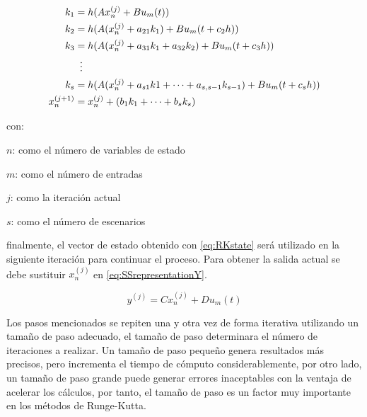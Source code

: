             \begin{equation}\label{eq:RKstate}
                \begin{aligned}
                    k_1 &= h(Ax_n^{(j)} + Bu_m(t))\\
                    k_2 &= h(A(x_n^{(j)} +  a_{21}k_1) + Bu_m(t + c_2 h))\\
                    k_3 &= h(A(x_n^{(j)} +  a_{31}k_1 + a_{32}k_2) + Bu_m(t  + c_3 h))\\
                    &\mathrel{\makebox[\widthof{=}]{\vdots}}\\
                    k_s &= h(A(x_n^{(j)} + a_{s1}k1 + \cdots +  a_{s,s-1}k_{s-1}) + Bu_m(t  + c_s h))\\
                    x_n^{(j+1)} &= x_n^{(j)} + (b_1 k_1 + \cdots + b_s k_s)
                \end{aligned}
            \end{equation}
            
            \noindent con:

            \begin{spacing}{1.5}
				
				$n$: como el número de variables de estado
				
				$m$: como el número de entradas
				
				$j$: como la iteración actual
                
                $s$: como el número de escenarios
            \end{spacing}

            \noindent finalmente, el vector de estado obtenido con \cref{eq:RKstate} será utilizado en la siguiente iteración para continuar el proceso. Para obtener la salida actual se debe sustituir $x_n^{(j)}$  en \cref{eq:SSrepresentationY}. 
            
            \begin{equation}
				y^{(j)} = Cx_n^{(j)} + Du_m(t) \label{eq:rkrepresentationY}
            \end{equation}
            
            Los pasos mencionados se repiten una y otra vez de forma iterativa utilizando un tamaño de paso adecuado, el tamaño de paso determinara el número de iteraciones a realizar. Un tamaño de paso pequeño genera resultados más precisos, pero incrementa el tiempo de cómputo considerablemente, por otro lado, un tamaño de paso grande puede generar errores inaceptables con la ventaja de acelerar los cálculos, por tanto, el tamaño de paso es un factor muy importante en los métodos de Runge-Kutta.

